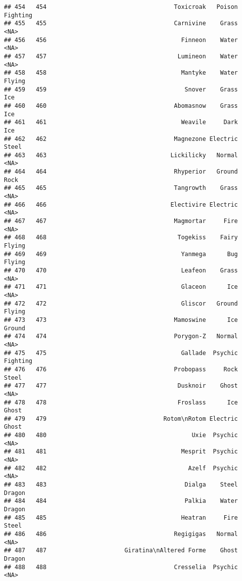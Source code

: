 \documentclass[
]{article}
\begin{document}
\begin{verbatim}
## 454   454                                    Toxicroak   Poison Fighting
## 455   455                                    Carnivine    Grass     <NA>
## 456   456                                      Finneon    Water     <NA>
## 457   457                                     Lumineon    Water     <NA>
## 458   458                                      Mantyke    Water   Flying
## 459   459                                       Snover    Grass      Ice
## 460   460                                    Abomasnow    Grass      Ice
## 461   461                                      Weavile     Dark      Ice
## 462   462                                    Magnezone Electric    Steel
## 463   463                                   Lickilicky   Normal     <NA>
## 464   464                                    Rhyperior   Ground     Rock
## 465   465                                    Tangrowth    Grass     <NA>
## 466   466                                   Electivire Electric     <NA>
## 467   467                                    Magmortar     Fire     <NA>
## 468   468                                     Togekiss    Fairy   Flying
## 469   469                                      Yanmega      Bug   Flying
## 470   470                                      Leafeon    Grass     <NA>
## 471   471                                      Glaceon      Ice     <NA>
## 472   472                                      Gliscor   Ground   Flying
## 473   473                                    Mamoswine      Ice   Ground
## 474   474                                    Porygon-Z   Normal     <NA>
## 475   475                                      Gallade  Psychic Fighting
## 476   476                                    Probopass     Rock    Steel
## 477   477                                     Dusknoir    Ghost     <NA>
## 478   478                                     Froslass      Ice    Ghost
## 479   479                                 Rotom\nRotom Electric    Ghost
## 480   480                                         Uxie  Psychic     <NA>
## 481   481                                      Mesprit  Psychic     <NA>
## 482   482                                        Azelf  Psychic     <NA>
## 483   483                                       Dialga    Steel   Dragon
## 484   484                                       Palkia    Water   Dragon
## 485   485                                      Heatran     Fire    Steel
## 486   486                                    Regigigas   Normal     <NA>
## 487   487                      Giratina\nAltered Forme    Ghost   Dragon
## 488   488                                    Cresselia  Psychic     <NA>

\end{verbatim}
\end{document}
